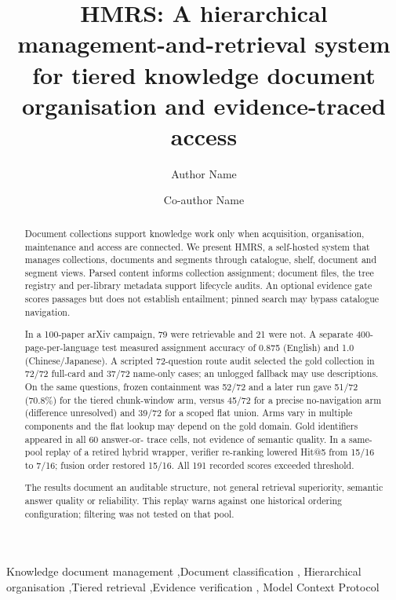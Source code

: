 \documentclass[final,5p,times,twocolumn]{elsarticle}
\begin{document}
\begin{frontmatter}

\title{HMRS: A hierarchical management-and-retrieval system for tiered
knowledge document organisation and evidence-traced access}

\author[inst1]{Author Name}
\author[inst1]{Co-author Name}

\begin{abstract}
Document collections support knowledge work only when acquisition,
organisation, maintenance and access are connected. We present HMRS, a
self-hosted system that manages collections, documents and segments through
catalogue, shelf, document and segment views. Parsed content informs collection
assignment; document files, the tree registry and per-library metadata support
lifecycle audits. An optional evidence gate scores passages but does not
establish entailment; pinned search may bypass catalogue navigation.

In a 100-paper arXiv campaign, 79 were retrievable and 21 were not. A separate
400-page-per-language test measured assignment accuracy of 0.875 (English) and
1.0 (Chinese/Japanese). A scripted 72-question route audit selected the gold
collection in 72/72 full-card and 37/72 name-only cases; an unlogged fallback
may use descriptions. On the same questions, frozen containment was 52/72 and
a later run gave 51/72 (70.8\%) for the tiered chunk-window arm,
versus 45/72 for a precise no-navigation arm (difference unresolved) and 39/72
for a scoped flat union. Arms vary in multiple components and the flat lookup
may depend on the gold domain. Gold identifiers appeared in all 60 answer-or-
trace cells, not evidence of semantic quality. In a same-pool replay of a
retired hybrid wrapper, verifier re-ranking lowered Hit@5 from 15/16 to 7/16;
fusion order restored 15/16. All 191 recorded scores exceeded threshold.

The results document an auditable structure, not general retrieval superiority,
semantic answer quality or reliability. This replay warns against one
historical ordering configuration; filtering was not tested on that pool.


\end{abstract}

\begin{keyword}
Knowledge document management \sep Document classification \sep
Hierarchical organisation \sep Tiered retrieval \sep Evidence verification \sep
Model Context Protocol
\end{keyword}

\end{frontmatter}
\end{document}
